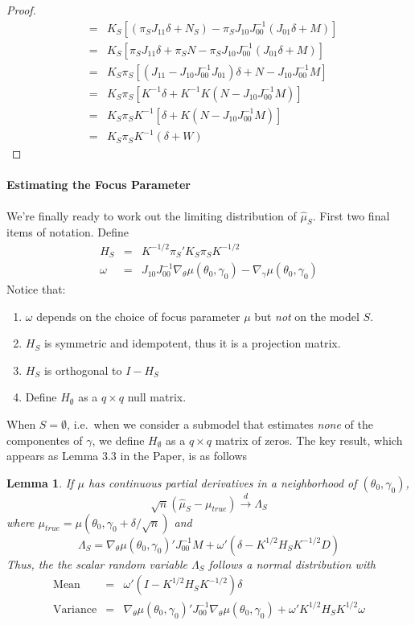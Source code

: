 \documentclass[12pt]{article}
\newtheorem{lem}{Lemma}
\theoremstyle{definition}
\begin{document}
\begin{proof}
\begin{eqnarray*}
&=& K_S \left[ \left(\pi_S J_{11}\delta + N_S \right) - \pi_S J_{10}J_{00}^{-1}\left(J_{01}\delta + M\right) \right]\\
&=& K_S \left[ \pi_S J_{11}\delta + \pi_S N - \pi_S J_{10}J_{00}^{-1}\left(J_{01}\delta + M\right) \right]\\
&=& K_S \pi_S \left[ \left(J_{11} - J_{10}J_{00}^{-1}J_{01}\right)\delta + N - J_{10}J_{00}^{-1} M \right]\\
&=& K_S \pi_S \left[ K^{-1}\delta +K^{-1}K \left(N - J_{10}J_{00}^{-1} M \right)\right]\\
&=& K_S \pi_S K^{-1} \left[ \delta +K \left(N - J_{10}J_{00}^{-1} M \right)\right]\\
&=& K_S \pi_S K^{-1} \left( \delta + W\right)
\end{eqnarray*}
\end{proof}

\paragraph{Estimating the Focus Parameter} We're finally ready to work out the limiting distribution of $\widehat{\mu}_S$. First two final items of notation. Define
\begin{eqnarray*}
H_S &=& K^{-1/2}\pi_S' K_S \pi_SK^{-1/2} \\
\omega &=& J_{10}J_{00}^{-1} \nabla_\theta \mu(\theta_0,\gamma_0) - \nabla_\gamma \mu(\theta_0, \gamma_0)
\end{eqnarray*}
Notice that:
\begin{enumerate}
\item $\omega$ depends on the choice of focus parameter $\mu$ but \emph{not} on the model $S$.
\item $H_S$ is symmetric and idempotent, thus it is a projection matrix.
\item $H_S$ is orthogonal to $I - H_S$
\item Define $H_{\emptyset}$ as a $q\times q$ null matrix.
\end{enumerate}
When $S = \emptyset$, i.e.\ when we consider a submodel that estimates \emph{none} of the componentes of $\gamma$, we define $H_\emptyset$ as a $q\times q$ matrix of zeros. The key result, which appears as Lemma 3.3 in the Paper, is as follows
\begin{lem}
\label{lem:mu}
If $\mu$ has continuous partial derivatives in a neighborhood of $(\theta_0, \gamma_0)$,
$$
\sqrt{n}\left( \hat{\mu}_S - \mu_{true} \right) \overset{d}{\rightarrow} \Lambda_S
$$
where $\mu_{true} = \mu(\theta_0, \gamma_0+\delta/\sqrt{n})$ and
$$
\Lambda_S = \nabla_\theta \mu(\theta_0, \gamma_0)' J_{00}^{-1} M + \omega'\left( \delta - K^{1/2}H_S K^{-1/2}D\right)
$$
Thus, the the scalar random variable $\Lambda_S$ follows a normal distribution with
\begin{eqnarray*}
\mbox{Mean}&=&\omega'(I - K^{1/2}H_SK^{-1/2})\delta\\
\mbox{Variance}&=&\nabla_\theta \mu(\theta_0, \gamma_0)'J_{00}^{-1}\nabla_\theta \mu(\theta_0, \gamma_0) + \omega'K^{1/2}H_S K^{1/2}\omega
\end{eqnarray*}	
\end{lem}
\end{document}
